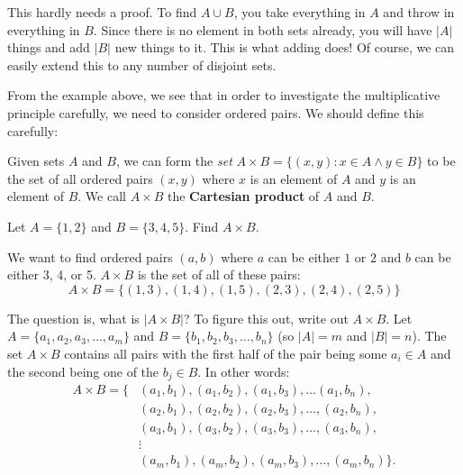 \documentclass[11pt,]{book}
\newcommand{\terminology}[1]{\textbf{#1}}
\theoremstyle{ptxplainnotitle}
\theoremstyle{ptxplaintitle}
\theoremstyle{ptxdefinitionnotitle}
\theoremstyle{ptxdefinitiontitle}
\theoremstyle{ptxdefinitionnotitle}
\theoremstyle{ptxdefinitiontitle}
\theoremstyle{ptxdefinitionnotitle}
\theoremstyle{ptxdefinitiontitle}
\theoremstyle{ptxdefinitiontitlenonumber}
\theoremstyle{ptxdefinitiontitlenonumber}
\numberwithin{equation}{chapter}
\newcommand{\st}{:}
\newcommand{\card}[1]{\left| #1 \right|}
\newcommand{\amp}{&}
\begin{document}
\hypertarget{p-1023}{}%
This hardly needs a proof. To find \(A \cup B\), you take everything in \(A\) and throw in everything in \(B\). Since there is no element in both sets already, you will have \(\card{A}\) things and add \(\card{B}\) new things to it. This is what adding does! Of course, we can easily extend this to any number of disjoint sets.%
\par
\hypertarget{p-1024}{}%
From the example above, we see that in order to investigate the multiplicative principle carefully, we need to consider ordered pairs. We should define this carefully:%
\begin{assemblage}\label{assemblage-14}
\hypertarget{p-1025}{}%
Given sets \(A\) and \(B\), we can form the \emph{set} \(A \times B = \{(x,y) \st x \in A \wedge y \in B\}\) to be the set of all ordered pairs \((x,y)\) where \(x\) is an element of \(A\) and \(y\) is an element of \(B\). We call \(A \times B\) the \terminology{Cartesian product} of \(A\) and \(B\).%
\end{assemblage}
\begin{example}\label{example-40}
\hypertarget{p-1026}{}%
Let \(A = \{1,2\}\) and \(B=\{3,4,5\}\). Find \(A \times B\).%
\par\smallskip%
\noindent\textbf{}\hypertarget{solution-142}{}\hypertarget{p-1027}{}%
We want to find ordered pairs \((a,b)\) where \(a\) can be either \(1\) or \(2\) and \(b\) can be either 3, 4, or 5. \(A \times B\) is the set of all of these pairs:%
\begin{equation*}
A \times B = \{(1,3), (1,4), (1,5), (2,3), (2,4), (2,5)\}
\end{equation*}
%
\end{example}
\hypertarget{p-1028}{}%
The question is, what is \(\card{A \times B}\)? To figure this out, write out \(A \times B\). Let \(A = \{a_1,a_2, a_3, \ldots, a_m\}\) and \(B = \{b_1,b_2, b_3, \ldots, b_n\}\) (so \(\card{A} = m\) and \(\card{B} = n\)). The set \(A \times B\) contains all pairs with the first half of the pair being some \(a_i \in A\) and the second being one of the \(b_j \in B\). In other words:%
\begin{align*}
A \times B = \{ \amp (a_1, b_1), (a_1, b_2), (a_1, b_3), \ldots (a_1, b_n),\\
\amp (a_2, b_1), (a_2, b_2), (a_2, b_3), \ldots, (a_2, b_n),\\
\amp (a_3, b_1), (a_3, b_2), (a_3, b_3), \ldots, (a_3, b_n),\\
\amp \vdots\\
\amp (a_m, b_1), (a_m, b_2), (a_m, b_3), \ldots, (a_m, b_n)\}.
\end{align*}
\end{document}
